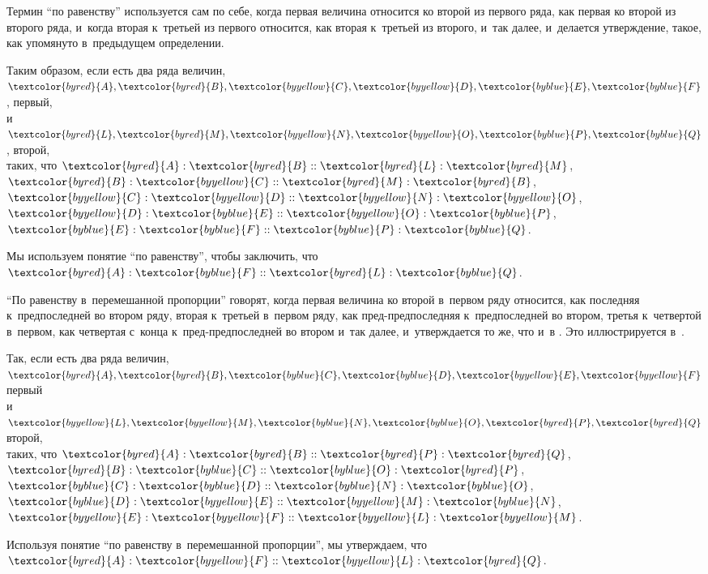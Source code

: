 \documentclass[letters,booklanguage=russian]{byrnebook}
\begin{document}
\label{def:V.XIX}
\def\varA{\textcolor{byred}{A}}
\def\varB{\textcolor{byred}{B}}
\def\varC{\textcolor{byyellow}{C}}
\def\varD{\textcolor{byyellow}{D}}
\def\varE{\textcolor{byblue}{E}}
\def\varF{\textcolor{byblue}{F}}
\def\varL{\textcolor{byred}{L}}
\def\varM{\textcolor{byred}{M}}
\def\varN{\textcolor{byyellow}{N}}
\def\varO{\textcolor{byyellow}{O}}
\def\varP{\textcolor{byblue}{P}}
\def\varQ{\textcolor{byblue}{Q}}
Термин \enquote{по равенству} используется сам по себе, когда первая величина относится ко второй из первого ряда, как первая ко второй из второго ряда, и~когда вторая к~третьей из первого относится, как вторая к~третьей из второго, и~так далее, и~делается утверждение, такое, как упомянуто в~предыдущем определении.

\begin{center}
Таким образом, если есть два ряда величин,\\
$\varA, \varB, \varC, \varD, \varE, \varF$, первый,\\
и $\varL, \varM, \varN, \varO, \varP, \varQ$, второй,\\
таких, что $\varA : \varB :: \varL : \varM$, $\varB : \varC :: \varM : \varB$, $\varC : \varD :: \varN : \varO$, $\varD : \varE :: \varO : \varP$, $\varE : \varF :: \varP : \varQ$.

Мы используем понятие \enquote{по равенству}, чтобы заключить, что $\varA : \varF :: \varL : \varQ$.
\end{center}

\vfill\pagebreak

\label{def:V.XX}
\def\varA{\textcolor{byred}{A}}
\def\varB{\textcolor{byred}{B}}
\def\varC{\textcolor{byblue}{C}}
\def\varD{\textcolor{byblue}{D}}
\def\varE{\textcolor{byyellow}{E}}
\def\varF{\textcolor{byyellow}{F}}
\def\varL{\textcolor{byyellow}{L}}
\def\varM{\textcolor{byyellow}{M}}
\def\varN{\textcolor{byblue}{N}}
\def\varO{\textcolor{byblue}{O}}
\def\varP{\textcolor{byred}{P}}
\def\varQ{\textcolor{byred}{Q}}
\enquote{По равенству в~перемешанной пропорции} говорят, когда первая величина ко второй в~первом ряду относится, как последняя к~предпоследней во втором ряду, вторая к~третьей в~первом ряду, как пред-предпоследняя к~предпоследней во втором, третья к~четвертой в~первом, как четвертая с~конца к~пред-предпоследней во втором и~так далее, и~утверждается то же, что и~в . Это иллюстрируется в~.

\begin{center}
Так, если есть два ряда величин,\\
$\varA, \varB, \varC, \varD, \varE, \varF$ первый\\
и $\varL, \varM, \varN, \varO, \varP, \varQ$ второй,\\
таких, что $\varA : \varB :: \varP : \varQ$, $\varB : \varC :: \varO : \varP$, $\varC : \varD :: \varN : \varO$, $\varD : \varE :: \varM : \varN$, $\varE : \varF :: \varL : \varM$.

Используя понятие \enquote{по равенству в~перемешанной пропорции}, мы утверждаем, что $\varA : \varF :: \varL : \varQ$.
\end{center}
\end{document}
